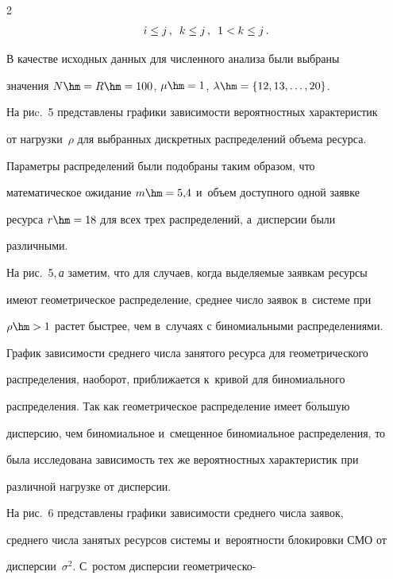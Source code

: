 \begin{multicols}{2}
\begin{multline*}
i\leq j\,,\enskip k\leq j\,,\enskip 1< k\leq j\,.

\end{multline*}

  

  В качестве исходных данных для численного анализа были выбраны 

значения $N\hm=R\hm=100$, $\mu\hm= 1$, $\lambda\hm= \{12, 13,\ldots, 20\}$. 

На риc.~5 пред\-став\-ле\-ны графики зависимости вероятностных характеристик 

от нагрузки~$\rho$ для выбранных дискретных распределений объема ресурса. 

Параметры распределений были подобраны таким образом, что 

математическое ожидание $m\hm=5{,}4$ и~объем доступного одной заявке 

ресурса $r\hm=18$ для всех трех распределений, а~дисперсии были 

различными. 

 

  

  

  

  На рис.~5,\,\textit{а} заметим, что для случаев, когда выделяемые заявкам ресурсы 

имеют геометрическое распределение, среднее число заявок в~системе при 

$\rho\hm>1$ растет быстрее, чем в~случаях с биномиальными распределениями. 

График зависимости среднего числа занятого ресурса для геометрического 

распределения, наоборот, приближается к~кривой для биномиального 

распределения. Так как геометрическое распределение имеет б$\acute{\mbox{о}}$льшую 

дисперсию, чем биномиальное и~смещенное биномиальное распределения, то 

была исследована зависимость тех же вероятностных характеристик при 

различной нагрузке от дисперсии.

  

  На рис.~6 представлены графики зависи\-мости среднего числа заявок, 

среднего числа занятых ресурсов системы и~вероятности блокировки СМО от 

дисперсии~$\sigma^2$. С~ростом дисперсии гео\-мет\-ри\-че\-ско-\linebreak\vspace*{-12pt}



\pagebreak



\setcounter{figure}{4}



\end{multicols}



